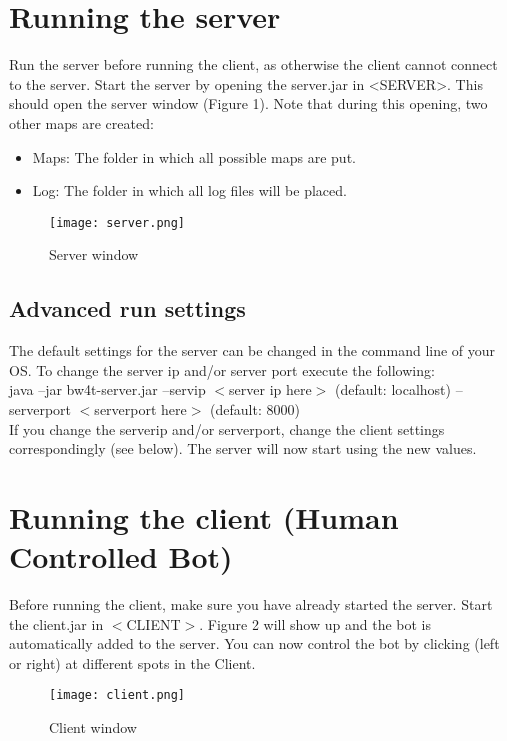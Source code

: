 \documentclass[11pt,a4paper]{article}
\begin{document}
\section{Running the server}
Run the server before running the client, as otherwise the client cannot connect to the server. Start the server by opening the server.jar in <SERVER>. This should open the server window (Figure 1). Note that during this opening, two other maps are created: 
\begin{itemize}
\item Maps: The folder in which all possible maps are put.
\item Log: The folder in which all log files will be placed.
\end{itemize}
\begin{figure}
    \texttt{[image: server.png]}
    \caption{Server window}
\end{figure}

\subsection{Advanced run settings}
The default settings for the server can be changed in the command line of your OS. To change the server ip and/or server port execute the following:\\

java –jar bw4t-server.jar –servip $<$server ip here$>$ (default: localhost) –serverport $<$serverport here$>$ (default: 8000)\\

If you change the serverip and/or serverport, change the client settings correspondingly (see below).
The server will now start using the new values.

\section{Running the client (Human Controlled Bot)}
Before running the client, make sure you have already started the server. Start the client.jar in $<$CLIENT$>$. Figure 2 will show up and the bot is automatically added to the server. You can now control the bot by clicking (left or right) at different spots in the Client.
\begin{wrapfigure}{r}{0.5\textwidth}
  \begin{center}
    \texttt{[image: client.png]}
  \end{center}
  \caption{Client window}
\end{wrapfigure}
\end{document}
